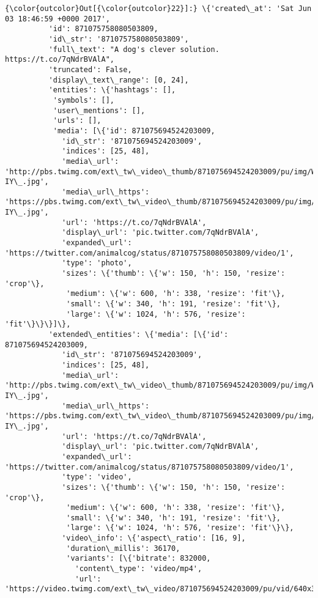 \documentclass[11pt]{article}
\begin{document}
\begin{Verbatim}[commandchars=\\\{\}]
{\color{outcolor}Out[{\color{outcolor}22}]:} \{'created\_at': 'Sat Jun 03 18:46:59 +0000 2017',
          'id': 871075758080503809,
          'id\_str': '871075758080503809',
          'full\_text': "A dog's clever solution. https://t.co/7qNdrBVAlA",
          'truncated': False,
          'display\_text\_range': [0, 24],
          'entities': \{'hashtags': [],
           'symbols': [],
           'user\_mentions': [],
           'urls': [],
           'media': [\{'id': 871075694524203009,
             'id\_str': '871075694524203009',
             'indices': [25, 48],
             'media\_url': 'http://pbs.twimg.com/ext\_tw\_video\_thumb/871075694524203009/pu/img/WAB4Nn412S6K-IY\_.jpg',
             'media\_url\_https': 'https://pbs.twimg.com/ext\_tw\_video\_thumb/871075694524203009/pu/img/WAB4Nn412S6K-IY\_.jpg',
             'url': 'https://t.co/7qNdrBVAlA',
             'display\_url': 'pic.twitter.com/7qNdrBVAlA',
             'expanded\_url': 'https://twitter.com/animalcog/status/871075758080503809/video/1',
             'type': 'photo',
             'sizes': \{'thumb': \{'w': 150, 'h': 150, 'resize': 'crop'\},
              'medium': \{'w': 600, 'h': 338, 'resize': 'fit'\},
              'small': \{'w': 340, 'h': 191, 'resize': 'fit'\},
              'large': \{'w': 1024, 'h': 576, 'resize': 'fit'\}\}\}]\},
          'extended\_entities': \{'media': [\{'id': 871075694524203009,
             'id\_str': '871075694524203009',
             'indices': [25, 48],
             'media\_url': 'http://pbs.twimg.com/ext\_tw\_video\_thumb/871075694524203009/pu/img/WAB4Nn412S6K-IY\_.jpg',
             'media\_url\_https': 'https://pbs.twimg.com/ext\_tw\_video\_thumb/871075694524203009/pu/img/WAB4Nn412S6K-IY\_.jpg',
             'url': 'https://t.co/7qNdrBVAlA',
             'display\_url': 'pic.twitter.com/7qNdrBVAlA',
             'expanded\_url': 'https://twitter.com/animalcog/status/871075758080503809/video/1',
             'type': 'video',
             'sizes': \{'thumb': \{'w': 150, 'h': 150, 'resize': 'crop'\},
              'medium': \{'w': 600, 'h': 338, 'resize': 'fit'\},
              'small': \{'w': 340, 'h': 191, 'resize': 'fit'\},
              'large': \{'w': 1024, 'h': 576, 'resize': 'fit'\}\},
             'video\_info': \{'aspect\_ratio': [16, 9],
              'duration\_millis': 36170,
              'variants': [\{'bitrate': 832000,
                'content\_type': 'video/mp4',
                'url': 'https://video.twimg.com/ext\_tw\_video/871075694524203009/pu/vid/640x360/8MNJRtaqh7cylswO.mp4'\},

\end{Verbatim}
\end{document}
